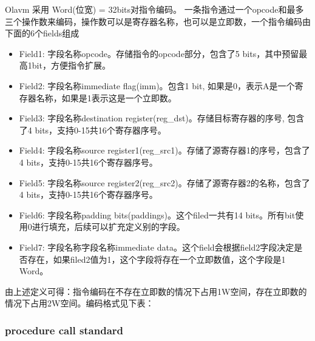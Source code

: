 Olavm 采用 Word(位宽) = 32bits对指令编码。
一条指令通过一个opcode和最多三个操作数来编码，操作数可以是寄存器名称，也可以是立即数，一个指令编码由下面的6个fields组成
\begin{itemize}
    \item Field1: 字段名称opcode。存储指令的opcode部分，包含了5 bits，其中预留最高1bit，方便指令扩展。
    \item Field2: 字段名称immediate flag(imm)。包含1 bit, 如果是0，表示A是一个寄存器名称，如果是1表示这是一个立即数。
    \item Field3: 字段名称destination register(reg\_dst)。存储目标寄存器的序号, 包含了4 bits，支持0-15共16个寄存器序号。
    \item Field4: 字段名称source register1(reg\_src1)。存储了源寄存器1的序号，包含了4 bits，支持0-15共16个寄存器序号。
    \item Field5: 字段名称source register2(reg\_src2)。存储了源寄存器2的名称，包含了4 bits，支持0-15共16个寄存器序号。
    \item Field6: 字段名称padding bits(paddings)。这个filed一共有14 bits。所有bit使用0进行填充，后续可以扩充定义别的字段。
    \item Field7: 字段名称字段名称immediate data。这个field会根据field2字段决定是否存在，如果filed2值为1，这个字段将存在一个立即数值，这个字段是1 Word。
\end{itemize}

由上述定义可得：指令编码在不存在立即数的情况下占用1W空间，存在立即数的情况下占用2W空间。编码格式见下表：

\begin{table}[!ht]
    \centering {}
    \caption{OlaVM指令编码格式}
    \label{table: processor_instruction_decode}
\end{table}


\subsubsection{procedure call standard}\label{subsec: processor-instructions-executor-abi}

